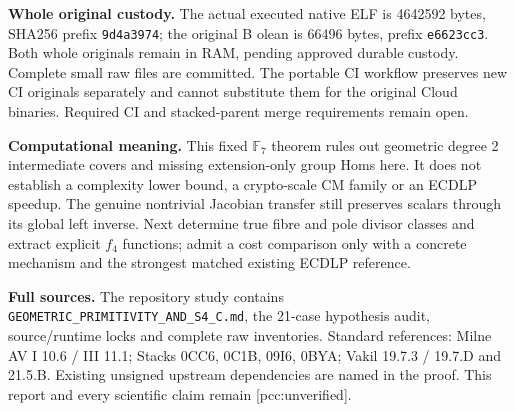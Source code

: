 \documentclass[10pt,a4paper]{article}
\begin{document}
\textbf{Whole original custody.} The actual executed native ELF is
4642592 bytes, SHA256 prefix \texttt{9d4a3974}; the original B olean is
66496 bytes, prefix \texttt{e6623cc3}. Both whole originals remain in RAM,
pending approved durable custody. Complete small raw files are committed.
The portable CI workflow preserves new CI originals separately and
cannot substitute them for the original Cloud binaries. Required CI and
stacked-parent merge requirements remain open.

\textbf{Computational meaning.} This fixed $\mathbb F_7$ theorem rules
out geometric degree 2 intermediate covers and missing extension-only
group Homs here. It does not establish a complexity lower bound, a
crypto-scale CM family or an ECDLP speedup. The genuine nontrivial
Jacobian transfer still preserves scalars through its global left
inverse. Next determine true fibre and pole divisor classes and extract
explicit $f_4$ functions; admit a cost comparison only with a concrete
mechanism and the strongest matched existing ECDLP reference.

\textbf{Full sources.} The repository study contains
\texttt{GEOMETRIC\_PRIMITIVITY\_AND\_S4\_C.md}, the 21-case hypothesis
audit, source/runtime locks and complete raw inventories. Standard
references: Milne AV I 10.6 / III 11.1; Stacks 0CC6, 0C1B, 09I6, 0BYA;
Vakil 19.7.3 / 19.7.D and 21.5.B. Existing unsigned upstream dependencies
are named in the proof. This report and every scientific claim remain
[pcc:unverified].
\end{document}
